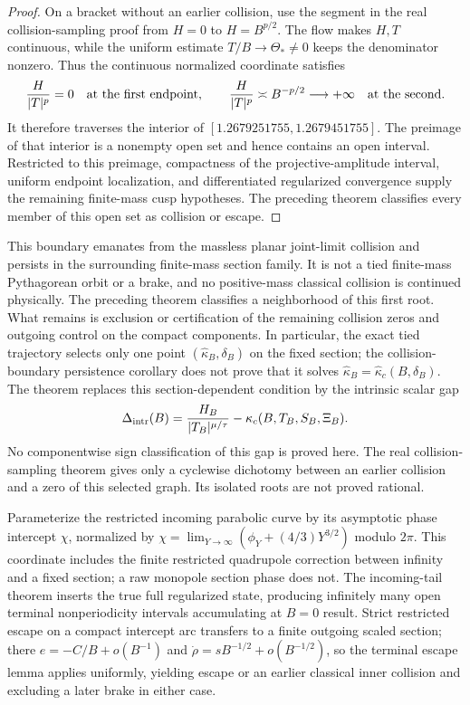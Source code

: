 \documentclass[11pt]{article}
\begin{document}
\begin{proof}
On a bracket without an earlier collision, use the segment in the real
collision-sampling proof from \(H=0\) to \(H=B^{p/2}\).  The flow makes
\(H,T\) continuous, while the uniform estimate
\(T/B\to\Theta_*\ne0\) keeps the denominator nonzero.  Thus the continuous
normalized coordinate satisfies
\[
 {H\over|T|^p}=0
 \quad\hbox{at the first endpoint},\qquad
 {H\over|T|^p}\asymp B^{-p/2}\longrightarrow+\infty
 \quad\hbox{at the second}.
\]
It therefore traverses the interior of
\([1.2679251755,1.2679451755]\).  The preimage of that interior is a nonempty
open set and hence contains an open interval.  Restricted to this preimage,
compactness of the projective-amplitude interval, uniform endpoint
localization, and differentiated regularized convergence supply the remaining
finite-mass cusp hypotheses.  The preceding theorem classifies every member
of this open set as collision or escape.
\end{proof}

This boundary emanates from the massless planar joint-limit collision and
persists in the surrounding finite-mass section family. It is not a tied
finite-mass Pythagorean orbit or a brake, and no positive-mass classical
collision is continued physically.  The preceding theorem classifies a
neighborhood of this first root. What remains is exclusion or certification
of the remaining collision zeros and outgoing control on the compact
components.  In
particular, the exact tied trajectory selects only one point
$(\widehat\kappa_B,\delta_B)$ on the fixed section; the collision-boundary
persistence corollary does not prove that it solves
$\widehat\kappa_B=\widehat\kappa_c(B,\delta_B)$.  The theorem replaces this
section-dependent condition by the intrinsic scalar gap
\[
 \Delta_{\rm intr}(B)=
 {H_B\over|T_B|^{\mu/\tau}}
 -\kappa_c(B,T_B,S_B,\Xi_B).
\]
No componentwise sign classification of this gap is proved here.  The real
collision-sampling theorem gives only a cyclewise dichotomy between an earlier
collision and a zero of this selected graph.  Its isolated roots are not
proved rational.

Parameterize the restricted incoming parabolic curve by its asymptotic phase
intercept $\chi$, normalized by
$\chi=\lim_{Y\to\infty}(\phi_Y+(4/3)Y^{3/2})$ modulo $2\pi$. This coordinate
includes the finite restricted quadrupole correction between infinity and a
fixed section; a raw monopole section phase does not. The incoming-tail
theorem inserts the true full regularized state, producing infinitely many
open terminal nonperiodicity intervals accumulating at
$B=0$ result. Strict restricted escape on a compact intercept arc
transfers to a finite outgoing scaled section; there
$e=-C/B+o(B^{-1})$ and $\dot\rho=sB^{-1/2}+o(B^{-1/2})$, so the terminal
escape lemma applies uniformly, yielding escape or an earlier classical inner
collision and excluding a later brake in either case.
\end{document}
